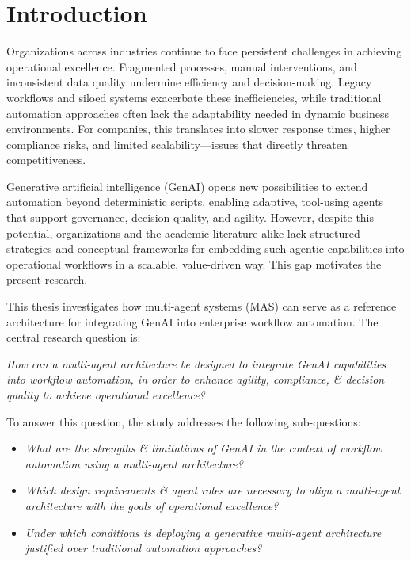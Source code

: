 \section{Introduction}
Organizations across industries continue to face persistent challenges in achieving operational excellence. Fragmented processes, manual interventions, and inconsistent data quality undermine efficiency and decision-making. Legacy workflows and siloed systems exacerbate these inefficiencies, while traditional automation approaches often lack the adaptability needed in dynamic business environments. For companies, this translates into slower response times, higher compliance risks, and limited scalability—issues that directly threaten competitiveness.

Generative artificial intelligence (GenAI) opens new possibilities to extend automation beyond deterministic scripts, enabling adaptive, tool-using agents that support governance, decision quality, and agility. However, despite this potential, organizations and the academic literature alike lack structured strategies and conceptual frameworks for embedding such agentic capabilities into operational workflows in a scalable, value-driven way. This gap motivates the present research.

This thesis investigates how multi-agent systems (MAS) can serve as a reference architecture for integrating GenAI into enterprise workflow automation. The central research question is:

\vspace{0.5\baselineskip}
\emph{How can a multi-agent architecture be designed to integrate GenAI capabilities into workflow automation, in order to enhance agility, compliance, \& decision quality to achieve operational excellence?}
\vspace{0.5\baselineskip}

To answer this question, the study addresses the following sub-questions:
\begin{itemize}
    \item \emph{What are the strengths \& limitations of GenAI in the context of workflow automation using a multi-agent architecture?}
    \item \emph{Which design requirements \& agent roles are necessary to align a multi-agent architecture with the goals of operational excellence?}
    \item \emph{Under which conditions is deploying a generative multi-agent architecture justified over traditional automation approaches?}
\end{itemize}

